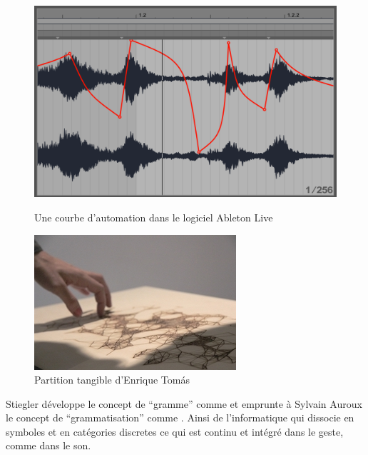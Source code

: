 \begin{figure}[!htbp]
	\captionsetup{format=plain}%
	\centering
	\begin{minipage}[t]{0.48\textwidth}
		\includegraphics[width=\linewidth]{gfx/03_gesture/AbletonLiveAutomation_72dpi.png}
		\caption{Une courbe d'automation dans le logiciel Ableton Live}
		\label{fig:gesture:automation}
	\end{minipage}
	\hspace{.02\linewidth}
	\begin{minipage}[t]{0.48\textwidth}
	  \includegraphics[width=\linewidth]{gfx/03_gesture/EnriqueThomas-TangibleScore_72dpi.jpg}
		\caption{Partition tangible d'Enrique Tomás}
		\label{fig:gesture:tangible_score}
	\end{minipage}
\end{figure}

Stiegler développe le concept de ``gramme'' comme  et emprunte à Sylvain Auroux \cite{auroux_revolution_1994} le concept de ``grammatisation'' comme . Ainsi de l'informatique qui dissocie en symboles et en catégories discretes ce qui est continu et intégré dans le geste, comme dans le son.

